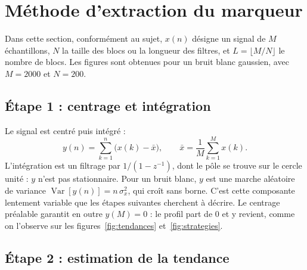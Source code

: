 \documentclass[11pt,a4paper]{article}
\begin{document}
\section{Méthode d'extraction du marqueur}
\label{sec:methode}

Dans cette section, conformément au sujet, $x(n)$ désigne un signal de $M$ échantillons, $N$ la taille des blocs ou la longueur des filtres, et $L = \lfloor M/N \rfloor$ le nombre de blocs. Les figures sont obtenues pour un bruit blanc gaussien, avec $M = 2000$ et $N = 200$.

\subsection{Étape 1 : centrage et intégration}

Le signal est centré puis intégré :
\begin{equation}
  y(n) = \sum_{k=1}^{n} \big( x(k) - \bar{x} \big), \qquad \bar{x} = \frac{1}{M} \sum_{k=1}^{M} x(k).
  \label{eq:integration}
\end{equation}
L'intégration est un filtrage par $1/(1-z^{-1})$, dont le pôle se trouve sur le cercle unité : $y$ n'est pas stationnaire. Pour un bruit blanc, $y$ est une marche aléatoire de variance $\operatorname{Var}[y(n)] = n\,\sigma_x^2$, qui croît sans borne. C'est cette composante lentement variable que les étapes suivantes cherchent à décrire. Le centrage préalable garantit en outre $y(M) = 0$ : le profil part de 0 et y revient, comme on l'observe sur les figures~\ref{fig:tendances} et~\ref{fig:strategies}.

\subsection{Étape 2 : estimation de la tendance}
\end{document}
